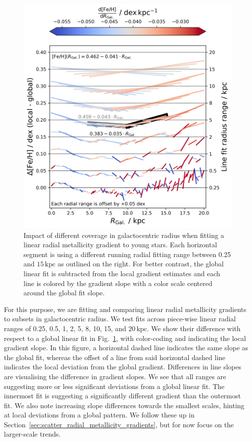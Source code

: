 \documentclass[fleqn,usenatbib]{mnras}
\begin{document}
\begin{figure}
    \centering
    \includegraphics[width=\columnwidth]{figures/radial_range_impact.png}
    \caption{Impact of different coverage in galactocentric radius when fitting a linear radial metallicity gradient to young stars. Each horizontal segment is using a different running radial fitting range between 0.25 and $15\,\mathrm{kpc}$ as outlined on the right. For better contrast, the global linear fit is subtracted from the local gradient estimates and each line is colored by the gradient slope with a color scale centered around the global fit slope.}
    \label{fig:radial_range_impact}
\end{figure}

For this purpose, we are fitting and comparing linear radial metallicity gradients to subsets in galactocentric radius. We test fits across piece-wise linear radial ranges of 0.25, 0.5, 1, 2, 5, 8, 10, 15, and $20\,\mathrm{kpc}$. We show their difference with respect to a global linear fit in Fig.~\ref{fig:radial_range_impact}, with color-coding and indicating the local gradient slope. In this figure, a horizontal dashed line indicates the same slope as the global fit, whereas the offset of a line from said horizontal dashed line indicates the local deviation from the global gradient. Differences in line slopes are visualising the difference in gradient slopes. We see that all ranges are suggesting more or less significant deviations from a global linear fit. The innermost fit is suggesting a significantly different gradient than the outermost fit. We also note increasing slope differences towards the smallest scales, hinting at local deviations from a global pattern. We follow these up in Section~\ref{sec:scatter_radial_metallicity_gradients}, but for now focus on the larger-scale trends.
\end{document}
